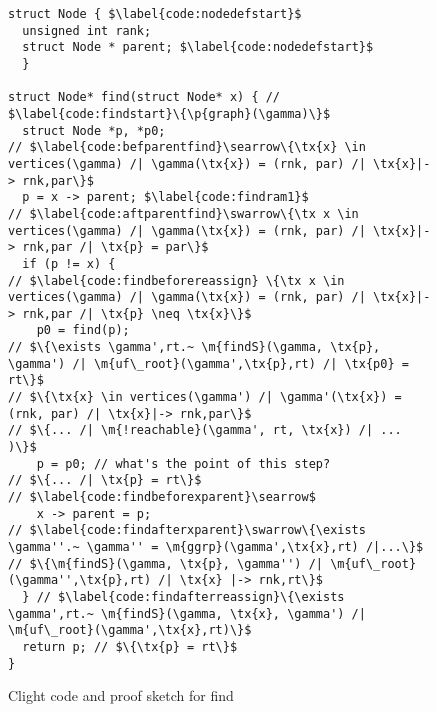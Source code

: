 \begin{figure}[t]
\vspace{-1ex}
  \begin{lstlisting}
struct Node { $\label{code:nodedefstart}$
  unsigned int rank;
  struct Node * parent; $\label{code:nodedefstart}$
  }

struct Node* find(struct Node* x) { // $\label{code:findstart}\{\p{graph}(\gamma)\}$
  struct Node *p, *p0;
// $\label{code:befparentfind}\searrow\{\tx{x} \in vertices(\gamma) /| \gamma(\tx{x}) = (rnk, par) /| \tx{x}|-> rnk,par\}$
  p = x -> parent; $\label{code:findram1}$
// $\label{code:aftparentfind}\swarrow\{\tx x \in vertices(\gamma) /| \gamma(\tx{x}) = (rnk, par) /| \tx{x}|-> rnk,par /| \tx{p} = par\}$ 
  if (p != x) {
// $\label{code:findbeforereassign} \{\tx x \in vertices(\gamma) /| \gamma(\tx{x}) = (rnk, par) /| \tx{x}|-> rnk,par /| \tx{p} \neq \tx{x}\}$
    p0 = find(p); 
// $\{\exists \gamma',rt.~ \m{findS}(\gamma, \tx{p}, \gamma') /| \m{uf\_root}(\gamma',\tx{p},rt) /| \tx{p0} = rt\}$
// $\{\tx{x} \in vertices(\gamma') /| \gamma'(\tx{x}) = (rnk, par) /| \tx{x}|-> rnk,par\}$
// $\{... /| \m{!reachable}(\gamma', rt, \tx{x}) /| ... )\}$   
    p = p0; // what's the point of this step?
// $\{... /| \tx{p} = rt\}$   
// $\label{code:findbeforexparent}\searrow$
    x -> parent = p;
// $\label{code:findafterxparent}\swarrow\{\exists \gamma''.~ \gamma'' = \m{ggrp}(\gamma',\tx{x},rt) /|...\}$
// $\{\m{findS}(\gamma, \tx{p}, \gamma'') /| \m{uf\_root}(\gamma'',\tx{p},rt) /| \tx{x} |-> rnk,rt\}$
  } // $\label{code:findafterreassign}\{\exists \gamma',rt.~ \m{findS}(\gamma, \tx{x}, \gamma') /| \m{uf\_root}(\gamma',\tx{x},rt)\}$   
  return p; // $\{\tx{p} = rt\}$
}
\end{lstlisting}








\vspace{-0.4em}
\caption{Clight code and proof sketch for find}
\label{fig:find}
\vspace{-1em}
\end{figure}